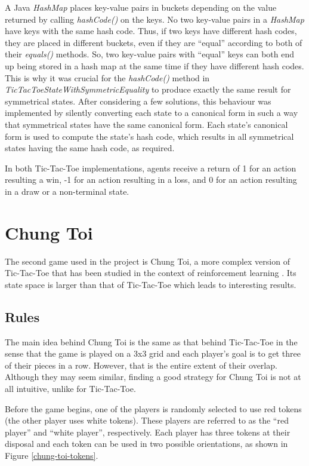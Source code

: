 \documentclass[11pt,a4paper]{report}
\begin{document}
A Java \emph{HashMap} places key-value pairs in buckets depending on the value returned by calling \emph{hashCode()} on the keys. No two key-value pairs in a \emph{HashMap} have keys with the same hash code. Thus, if two keys have different hash codes, they are placed in different buckets, even if they are ``equal'' according to both of their \emph{equals()} methods. So, two key-value pairs with ``equal'' keys can both end up being stored in a hash map at the same time if they have different hash codes. This is why it was crucial for the \emph{hashCode()} method in \emph{TicTacToeStateWithSymmetricEquality} to produce exactly the same result for symmetrical states. After considering a few solutions, this behaviour was implemented by silently converting each state to a canonical form in such a way that symmetrical states have the same canonical form. Each state's canonical form is used to compute the state's hash code, which results in all symmetrical states having the same hash code, as required.

In both Tic-Tac-Toe implementations, agents receive a return of 1 for an action resulting a win, -1 for an action resulting in a loss, and 0 for an action resulting in a draw or a non-terminal state.


\newpage

\section{Chung Toi}
\label{sec:ChungToi}

The second game used in the project is Chung Toi, a more complex version of Tic-Tac-Toe that has been studied in the context of reinforcement learning \cite{chung-toi-rl}. Its state space is larger than that of Tic-Tac-Toe which leads to interesting results.


\subsection{Rules}
\label{sec:ChungToiRules}

The main idea behind Chung Toi \cite{chung-toi-rules} is the same as that behind Tic-Tac-Toe in the sense that the game is played on a 3x3 grid and each player's goal is to get three of their pieces in a row. However, that is the entire extent of their overlap. Although they may seem similar, finding a good strategy for Chung Toi is not at all intuitive, unlike for Tic-Tac-Toe.

Before the game begins, one of the players is randomly selected to use red tokens (the other player uses white tokens). These players are referred to as the ``red player'' and ``white player'', respectively. Each player has three tokens at their disposal and each token can be used in two possible orientations, as shown in Figure \ref{chung-toi-tokens}.
\end{document}
